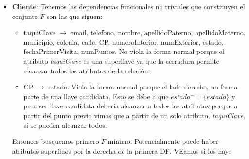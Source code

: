 \documentclass[11pt,letterpaper]{article}
\begin{document}
\begin{itemize}
\item \textbf{Cliente}: Tenemos las dependencias funcionales no triviales que constituyen el conjunto $F$ son las que siguen:

\begin{itemize}
\item taquiClave $\rightarrow$ email, telefono, nombre, apellidoPaterno, apellidoMaterno,  municipio, colonia, calle, CP, numeroInterior, numExterior, estado, fechaPrimerVisita, numPuntos. No viola la forma normal porque el atributo \textit{taquiClave} es una superllave ya que la cerradura permite alcanzar todos los atributos de la relación. 
\item CP $\rightarrow$ estado. Viola la forma normal porque el lado derecho, no forma parte de una llave candidata. Esto se debe a que $estado^+ =\{estado\}$ y para ser llave candidata debería alcanzar a todos los atributos porque a partir del punto previo vimos que a partir de un solo atributo, \textit{taquiClave}, sí se pueden alcanzar todos.
\end{itemize}



Entonces busquemos primero $F$ mínimo. Potencialmente puede haber atributos superfluos por la derecha de la primera DF. VEamos si los hay:


\end{itemize}
\end{document}
